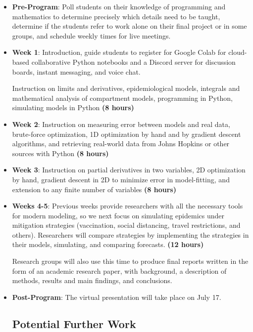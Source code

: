 \documentclass{article}
\begin{document}
\begin{itemize}
\item \textbf{Pre-Program}: Poll students on their knowledge of programming and mathematics to determine precisely which details need to be taught, determine if the students refer to work alone on their final project or in some groups, and schedule weekly times for live meetings.

\item \textbf{Week 1}: Introduction, guide students to register for Google Colab for cloud-based collaborative Python notebooks and a Discord server for discussion boards, instant messaging, and voice chat.

Instruction on limits and derivatives, epidemiological models, integrals and mathematical analysis of compartment models, programming in Python, simulating models in Python \textbf{(8 hours)}

\item \textbf{Week 2}: Instruction on measuring error between models and real data, brute-force optimization, 1D optimization by hand and by gradient descent algorithms, and retrieving real-world data from Johns Hopkins or other sources with Python \textbf{(8 hours)}

\item \textbf{Week 3}: Instruction on partial derivatives in two variables, 2D optimization by hand, gradient descent in 2D to minimize error in model-fitting, and extension to any finite number of variables \textbf{(8 hours)}

\item \textbf{Weeks 4-5}: Previous weeks provide researchers with all the necessary tools for modern modeling, so we next focus on simulating epidemics under mitigation strategies (vaccination, social distancing, travel restrictions, and others). Researchers will compare strategies by implementing the strategies in their models, simulating, and comparing forecasts. \textbf{(12 hours)}

\bigskip

Research groups will also use this time to produce final reports written in the form of an academic research paper, with background, a description of methods, results and main findings, and conclusions.

\item \textbf{Post-Program}: The virtual presentation will take place on July 17.

\subsection*{Potential Further Work}


\end{itemize}
\end{document}
